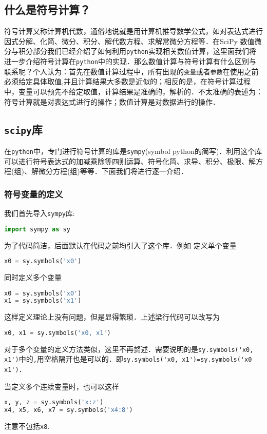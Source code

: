 
\subsection{什么是符号计算？}
符号计算又称计算机代数，通俗地说就是用计算机推导数学公式，如对表达式进行因式分解、化简、微分、积分、解代数方程、求解常微分方程等．在SciPy 数值微分与积分部分我们已经介绍了如何利用\verb|python|实现相关数值计算，这里面我们将进一步介绍符号计算在\verb|python|中的实现．那么数值计算与符号计算有什么区别与联系呢？个人认为：首先在数值计算过程中，所有出现的\verb|变量|或者\verb|参数|在使用之前必须给定具体取值,并且计算结果大多数是近似的；相反的是，在符号计算过程中，变量可以预先不给定取值，计算结果是准确的，解析的．不太准确的表述为：符号计算就是对表达式进行的操作；数值计算是对数据进行的操作．

\subsection{\verb|scipy|库}
在\verb|python|中，专门进行符号计算的库是\verb|sympy|(symbol python的简写)．利用这个库可以进行符号表达式的加减乘除等四则运算、符号化简、求导、积分、极限、解方程(组)、解微分方程(组)等等．下面我们将进行逐一介绍．

\subsubsection{符号变量的定义}
我们首先导入\verb|sympy|库:
\begin{lstlisting}[language=python]
import sympy as sy
\end{lstlisting}
为了代码简洁，后面默认在代码之前均引入了这个库．例如
定义单个变量
\begin{lstlisting}[language=python]
x0 = sy.symbols('x0')
\end{lstlisting}
同时定义多个变量
\begin{lstlisting}[language=python]
x0 = sy.symbols('x0')
x1 = sy.symbols('x1')
\end{lstlisting}
这样定义理论上没有问题，但是显得繁琐．上述梁行代码可以改写为
\begin{lstlisting}[language=python]
x0, x1 = sy.symbols('x0, x1')
\end{lstlisting}
对于多个变量的定义方法类似，这里不再赘述．需要说明的是\verb|sy.symbols('x0, x1')|中的\verb|,|用空格隔开也是可以的．即\verb|sy.symbols('x0, x1')=sy.symbols('x0 x1')|．

当定义多个连续变量时，也可以这样
\begin{lstlisting}[language=python]
 x, y, z = sy.symbols('x:z')
x4, x5, x6, x7 = sy.symbols('x4:8')
\end{lstlisting}
注意不包括\verb|x8|.

